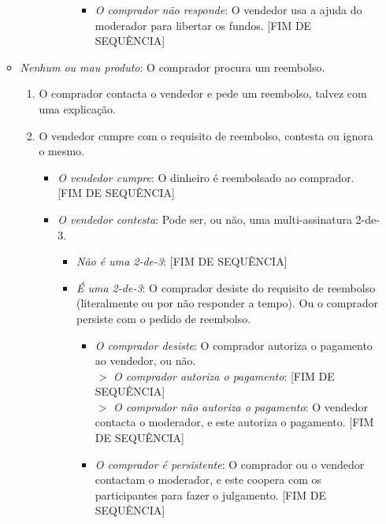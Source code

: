 \begin{enumerate}
\begin{itemize}
\begin{itemize}
\begin{itemize}
\begin{enumerate}
\begin{itemize}
                        \item {\em O comprador não responde}: O vendedor usa a ajuda do moderador para libertar os fundos. [FIM DE SEQUÊNCIA]
                    \end{itemize}{}
                \end{enumerate}{}
            \end{itemize}
        \end{itemize}{}
        \item {\em Nenhum ou mau produto}: O comprador procura um reembolso.
        \begin{enumerate}
            \item O comprador contacta o vendedor e pede um reembolso, talvez com uma explicação.
            \item O vendedor cumpre com o requisito de reembolso, contesta ou ignora o mesmo.
            \begin{itemize}
                \item {\em O vendedor cumpre}: O dinheiro é reembolsado ao comprador. [FIM DE SEQUÊNCIA]
                \item {\em O vendedor contesta}: Pode ser, ou não, uma multi-assinatura 2-de-3.
                \begin{itemize}
                    \item {\em Não é uma 2-de-3}: [FIM DE SEQUÊNCIA]
                    \item {\em É uma 2-de-3}: O comprador desiste do requisito de reembolso (literalmente ou por não responder a tempo). Ou o comprador persiste com o pedido de reembolso. 
                    \begin{itemize}
                        \item {\em O comprador desiste}: O comprador autoriza o pagamento ao vendedor, ou não.\\
                        $>$ {\em O comprador autoriza o pagamento}: [FIM DE SEQUÊNCIA]\\
                        $>$ {\em O comprador não autoriza o pagamento}: O vendedor contacta o moderador, e este autoriza o pagamento. [FIM DE SEQUÊNCIA]
                        \item {\em O comprador é persistente}: O comprador ou o vendedor contactam o moderador, e este coopera com os participantes para fazer o julgamento. [FIM DE SEQUÊNCIA]
                    \end{itemize}{}
                \end{itemize}
            \end{itemize}{}
        \end{enumerate}{}
    \end{itemize}{}
\end{enumerate}{}



